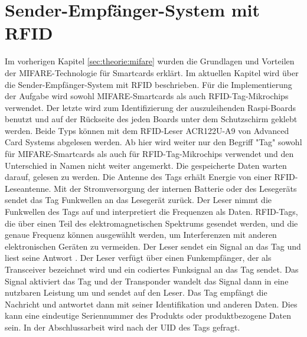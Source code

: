 \section{Sender-Empfänger-System mit RFID}
\label{sec:theorie:rfid}
Im vorherigen Kapitel \ref{sec:theorie:mifare} wurden die Grundlagen und Vorteilen der MIFARE-Technologie für Smartcards erklärt. Im aktuellen Kapitel wird über die  Sender-Empfänger-System mit RFID beschrieben. Für die Implementierung der Aufgabe wird sowohl MIFARE-Smartcards als auch RFID-Tag-Mikrochips verwendet. Der letzte wird zum Identifizierung der auszuleihenden Raspi-Boards benutzt und auf der Rückseite des jeden Boards unter dem Schutzschirm geklebt werden. Beide Typs können mit dem RFID-Leser ACR122U-A9 von Advanced Card Systems abgelesen werden. Ab hier wird weiter nur den Begriff "Tag" sowohl für MIFARE-Smartcards als auch für RFID-Tag-Mikrochips verwendet und den Unterschied in Namen nicht weiter angemerkt. Die gespeicherte Daten warten darauf, gelesen zu werden. Die Antenne des Tags erhält Energie von einer RFID-Leseantenne. Mit der Stromversorgung der internen Batterie oder des Lesegeräts sendet das Tag Funkwellen an das Lesegerät zurück. Der Leser nimmt die Funkwellen des Tags auf und interpretiert die Frequenzen als Daten. RFID-Tags, die über einen Teil des elektromagnetischen Spektrums gesendet werden, und die genaue Frequenz können ausgewählt werden, um Interferenzen mit anderen elektronischen Geräten zu vermeiden. Der Leser sendet ein Signal an das Tag und liest seine Antwort \cite{website:13}. Der Leser verfügt über einen Funkempfänger, der als Transceiver bezeichnet wird und ein codiertes Funksignal an das Tag sendet. Das Signal aktiviert das Tag und der Transponder wandelt das Signal dann in eine nutzbaren Leistung um und sendet auf den Leser. Das Tag empfängt die Nachricht und antwortet dann mit seiner Identifikation und anderen Daten. Dies kann eine eindeutige Seriennummer des Produkts oder produktbezogene Daten sein. In der Abschlussarbeit wird nach der UID des Tags gefragt. 

